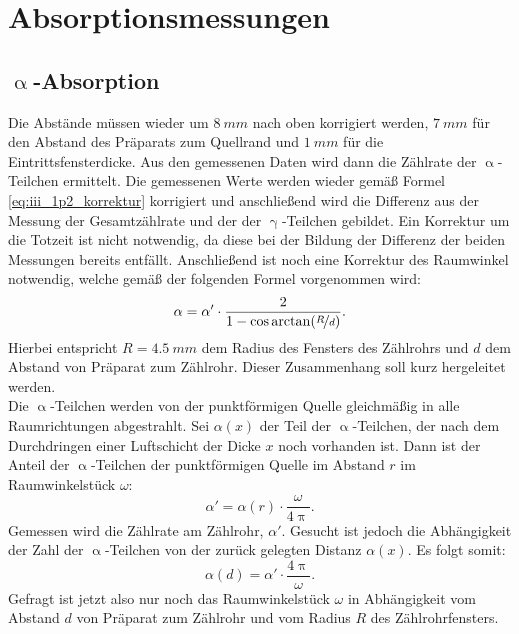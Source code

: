 \FloatBarrier
\section{Absorptionsmessungen}
\subsection{\texorpdfstring{$\upalpha$}{Alpha}-Absorption}
Die Abstände müssen wieder um $\SI{8}{mm}$ nach oben korrigiert werden, $\SI{7}{mm}$ für den Abstand des Präparats zum Quellrand und $\SI{1}{mm}$ für die Eintrittsfensterdicke. Aus den gemessenen Daten wird dann die Zählrate der $\upalpha$-Teilchen ermittelt. Die gemessenen Werte werden wieder gemäß Formel \eqref{eq:iii_1p2_korrektur} korrigiert und anschließend wird die Differenz aus der Messung der Gesamtzählrate und der der $\upgamma$-Teilchen gebildet. Ein Korrektur um die Totzeit ist nicht notwendig, da diese bei der Bildung der Differenz der beiden Messungen bereits entfällt. Anschließend ist noch eine Korrektur des Raumwinkel notwendig, welche gemäß der folgenden Formel vorgenommen wird:
\begin{equation}
\alpha = \alpha' \cdot \frac{2}{1-\cos\arctan(\nicefrac{R}{d})}.\label{eq:iii_2_winkel}
\end{equation}
Hierbei entspricht $R = \SI{4,5}{mm}$ dem Radius des Fensters des Zählrohrs und $d$ dem Abstand von Präparat zum Zählrohr. Dieser Zusammenhang soll kurz hergeleitet werden.\\
Die $\upalpha$-Teilchen werden von der punktförmigen Quelle gleichmäßig in alle Raumrichtungen abgestrahlt. Sei $\alpha(x)$ der Teil der $\upalpha$-Teilchen, der nach dem Durchdringen einer Luftschicht der Dicke $x$ noch vorhanden ist. Dann ist der Anteil der $\upalpha$-Teilchen der punktförmigen Quelle im Abstand $r$ im Raumwinkelstück $\omega$:
\begin{equation}
\alpha' = \alpha(r) \cdot \frac{\omega}{4 \uppi}.\label{eq:iii_2_abh}
\end{equation}
Gemessen wird die Zählrate am Zählrohr, $\alpha'$. Gesucht ist jedoch die Abhängigkeit der Zahl der $\upalpha$-Teilchen von der zurück gelegten Distanz $\alpha(x)$. Es folgt somit:
\begin{equation}
\alpha(d) = \alpha' \cdot \frac{4\uppi}{\omega}.
\end{equation}
Gefragt ist jetzt also nur noch das Raumwinkelstück $\omega$ in Abhängigkeit vom Abstand $d$ von Präparat zum Zählrohr und vom Radius $R$ des Zählrohrfensters.\\
